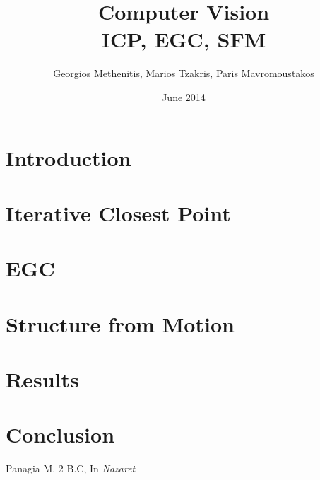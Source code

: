 \documentclass[11pt,twocolumn]{article}
\title{Computer Vision\\ICP, EGC, SFM}
\author{Georgios Methenitis, Marios Tzakris, Paris Mavromoustakos}
\affil{University of Amsterdam}
\date{June 2014}
\begin{document}
\maketitle

\renewcommand{\labelenumi}{\alph{enumi}.}

\section{Introduction}\label{intro}


\section{Iterative Closest Point}\label{icp}


\section{EGC}\label{egc}


\section{Structure from Motion}\label{sfm}


\section{Results}\label{results}

 
\section{Conclusion}


\begin{thebibliography}{9}

Panagia M. 2 B.C, In \emph{Nazaret}

\end{thebibliography}
\end{document}
